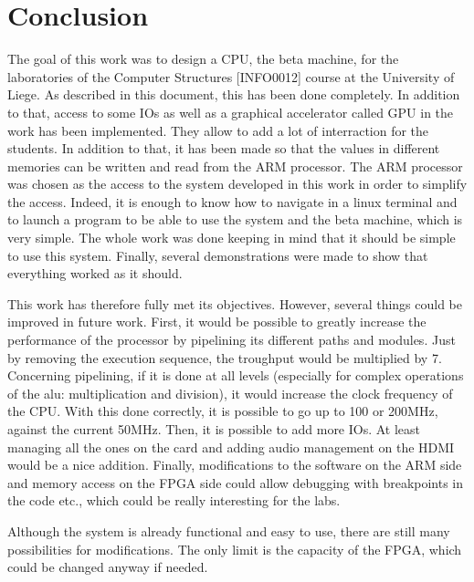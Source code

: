 \chapter{Conclusion}

The goal of this work was to design a CPU, the beta machine, for the laboratories of the Computer 
Structures [INFO0012] 
course at the University of Liege. As described in this document, this has been done completely. In 
addition to that, access to some IOs as well as a graphical accelerator called GPU in the work has been
implemented. They allow to add a lot of interraction for the students. In addition to that, it has 
been made so that the values in different memories can be written and read from the ARM processor. 
The ARM processor was chosen as the access to the system developed in this work in order to simplify 
the access. Indeed, it is enough to know how to navigate in a linux terminal and to launch a program 
to be able to use the system and the beta machine, which is very simple. The whole work was done 
keeping in mind that it should be simple to use this system. Finally, several demonstrations were 
made to show that everything worked as it should.

This work has therefore fully met its objectives. However, several things could be improved in future 
work. First, it would be possible to greatly increase the performance of the processor by pipelining 
its different paths and modules. Just by removing the execution sequence, the troughput would be 
multiplied by 7. Concerning pipelining, if it is done at all levels (especially for complex operations 
of the alu: multiplication and division), it would increase the clock frequency of the CPU. With 
this done correctly, it is possible to go up to 100 or 200MHz, against the current 50MHz. Then, it 
is possible to add more IOs. At least managing all the ones on the card and adding audio management 
on the HDMI would be a nice addition. Finally, modifications to the software on the ARM side and 
memory access on the FPGA side could allow debugging with breakpoints in the code etc., which could 
be really interesting for the labs. 

Although the system is already functional and easy to use, there are still many possibilities for 
modifications. The only limit is the capacity of the FPGA, which could be changed anyway if needed.
